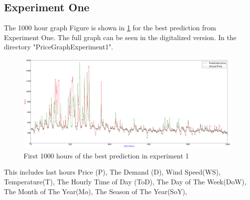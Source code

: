 \subsection{Experiment One}
The 1000 hour graph Figure is shown in \ref{fig:fullPageExperiment1} for the best prediction from Experiment One. The full graph can be seen in the digitalized version. In the directory "PriceGraphExperiment1".

\begin{figure}
\centering
\includegraphics[width=\linewidth]{billeder/PriceGraphs/Experiment1.png}
\caption{First 1000 hours of the best prediction in experiment 1}
\label{fig:fullPageExperiment1}
\end{figure}

This includes last hours Price (P), The Demand (D), Wind Speed(WS), Temperature(T), The Hourly Time of Day (ToD), The Day of The Week(DoW), The Month of The Year(Mo), The Season of The Year(SoY),

